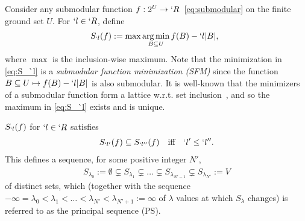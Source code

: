 Consider any submodular function $f:2^U\to `R$~\eqref{eq:submodular} on the finite ground set $U$. For $`l\in `R$, define
\begin{align}
\kern-.5em S_{`l}(f):=\max \operatorname*{arg\,min}_{B\subseteq U} f(B)-`l\lvert B\rvert, \label{eq:S_`l}
\end{align}
where $\max$ is the inclusion-wise maximum.
Note that the minimization in \eqref{eq:S_`l} is a \emph{submodular function minimization (SFM)}
since the function $B\subseteq U\mapsto f(B)-`l\lvert B\rvert$ is also submodular. It is well-known that
the minimizers of a submodular function form a lattice w.r.t. set inclusion~\cite{schrijver02}, and so the maximum
in \eqref{eq:S_`l} exists and is unique.  
\begin{Proposition} 
	\label{prop:ps}
	$S_{`l}(f)$ for $`l\in`R$ satisfies
	 \begin{align*}
		 \label{eq:aaa-ps}
	 	S_{`l'}(f)\subseteq S_{`l''}(f) \kern1em \text {iff} \kern1em `l'\leq `l''.
	 \end{align*}
	 This defines a  sequence, for some positive integer $N'$, 
	 \begin{align}
		 \label{eq:aaa-pss}
		 S_{\lambda_{0}} := \emptyset \subsetneq S_{\lambda_1} \subsetneq \dots \subsetneq S_{\lambda_{N'-1}} \subsetneq S_{\lambda_{N'}} := V
	 \end{align}
	 of distinct sets, which
	 (together with the sequence $-\infty = \lambda_{0} < \lambda_1 < \dots < \lambda_{N'} <
	 \lambda_{N'+1} := \infty$ of $\lambda$ values at which $S_{\lambda}$ changes)
	 is referred to as the principal sequence (PS).
\end{Proposition}

